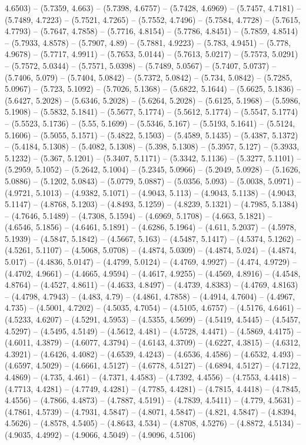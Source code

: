 4.6503) -- (5.7359, 4.663) -- (5.7398, 4.6757) -- (5.7428, 4.6969) -- (5.7457, 4.7181) -- (5.7489, 4.7223) -- (5.7521, 4.7265) -- (5.7552, 4.7496) -- (5.7584, 4.7728) -- (5.7615, 4.7793) -- (5.7647, 4.7858) -- (5.7716, 4.8154) -- (5.7786, 4.8451) -- (5.7859, 4.8514) -- (5.7933, 4.8578) -- (5.7907, 4.89) -- (5.7881, 4.9223) -- (5.783, 4.9451) -- (5.778, 4.9678) -- (5.7717, 4.9911) -- (5.7653, 5.0144) -- (5.7613, 5.0217) -- (5.7573, 5.0291) -- (5.7572, 5.0344) -- (5.7571, 5.0398) -- (5.7489, 5.0567) -- (5.7407, 5.0737) -- (5.7406, 5.079) -- (5.7404, 5.0842) -- (5.7372, 5.0842) -- (5.734, 5.0842) -- (5.7285, 5.0967) -- (5.723, 5.1092) -- (5.7026, 5.1368) -- (5.6822, 5.1644) -- (5.6625, 5.1836) -- (5.6427, 5.2028) -- (5.6346, 5.2028) -- (5.6264, 5.2028) -- (5.6125, 5.1968) -- (5.5986, 5.1908) -- (5.5832, 5.1841) -- (5.5677, 5.1774) -- (5.5612, 5.1774) -- (5.5547, 5.1774) -- (5.5523, 5.1736) -- (5.55, 5.1699) -- (5.5346, 5.167) -- (5.5193, 5.1641) -- (5.5124, 5.1606) -- (5.5055, 5.1571) -- (5.4822, 5.1503) -- (5.4589, 5.1435) -- (5.4387, 5.1372) -- (5.4184, 5.1308) -- (5.4082, 5.1308) -- (5.398, 5.1308) -- (5.3957, 5.127) -- (5.3933, 5.1232) -- (5.367, 5.1201) -- (5.3407, 5.1171) -- (5.3342, 5.1136) -- (5.3277, 5.1101) -- (5.2959, 5.1052) -- (5.2642, 5.1004) -- (5.2345, 5.0966) -- (5.2049, 5.0928) -- (5.1626, 5.0886) -- (5.1202, 5.0843) -- (5.0779, 5.0887) -- (5.0356, 5.093) -- (5.0038, 5.0971) -- (4.9721, 5.1013) -- (4.9382, 5.1071) -- (4.9043, 5.113) -- (4.9043, 5.1138) -- (4.9043, 5.1147) -- (4.8768, 5.1203) -- (4.8493, 5.1259) -- (4.8239, 5.1321) -- (4.7985, 5.1384) -- (4.7646, 5.1489) -- (4.7308, 5.1594) -- (4.6969, 5.1708) -- (4.663, 5.1821) -- (4.6546, 5.1856) -- (4.6461, 5.1891) -- (4.6286, 5.1964) -- (4.611, 5.2037) -- (4.5978, 5.1939) -- (4.5847, 5.1842) -- (4.5667, 5.163) -- (4.5487, 5.1417) -- (4.5374, 5.1262) -- (4.5261, 5.1107) -- (4.5068, 5.0708) -- (4.4874, 5.0309) -- (4.4874, 5.024) -- (4.4874, 5.017) -- (4.4836, 5.0147) -- (4.4799, 5.0124) -- (4.4769, 4.9927) -- (4.474, 4.9729) -- (4.4702, 4.9661) -- (4.4665, 4.9594) -- (4.4617, 4.9255) -- (4.4569, 4.8916) -- (4.4548, 4.8764) -- (4.4527, 4.8611) -- (4.4633, 4.8497) -- (4.4739, 4.8383) -- (4.4769, 4.8163) -- (4.4798, 4.7943) -- (4.483, 4.79) -- (4.4861, 4.7858) -- (4.4914, 4.7604) -- (4.4967, 4.735) -- (4.5001, 4.7202) -- (4.5035, 4.7054) -- (4.5105, 4.6757) -- (4.5176, 4.6461) -- (4.5233, 4.6207) -- (4.5291, 4.5953) -- (4.5355, 4.5699) -- (4.5419, 4.5445) -- (4.5457, 4.5297) -- (4.5495, 4.5149) -- (4.5612, 4.481) -- (4.5728, 4.4471) -- (4.5869, 4.4175) -- (4.6011, 4.3879) -- (4.6077, 4.3794) -- (4.6143, 4.3709) -- (4.6227, 4.3815) -- (4.6312, 4.3921) -- (4.6426, 4.4082) -- (4.6539, 4.4243) -- (4.6536, 4.4586) -- (4.6532, 4.493) -- (4.6597, 4.5029) -- (4.6661, 4.5127) -- (4.6778, 4.5127) -- (4.6894, 4.5127) -- (4.7122, 4.4869) -- (4.735, 4.461) -- (4.7371, 4.4583) -- (4.7392, 4.4556) -- (4.7553, 4.4418) -- (4.7713, 4.4281) -- (4.7749, 4.4281) -- (4.7785, 4.4281) -- (4.7815, 4.4418) -- (4.7845, 4.4556) -- (4.7866, 4.4873) -- (4.7887, 4.5191) -- (4.7839, 4.5411) -- (4.779, 4.5631) -- (4.7861, 4.5739) -- (4.7931, 4.5847) -- (4.8071, 4.5847) -- (4.821, 4.5847) -- (4.8394, 4.5626) -- (4.8578, 4.5405) -- (4.8643, 4.534) -- (4.8708, 4.5276) -- (4.8872, 4.5134) -- (4.9035, 4.4992) -- (4.9066, 4.5049) -- (4.9096, 4.5106) 